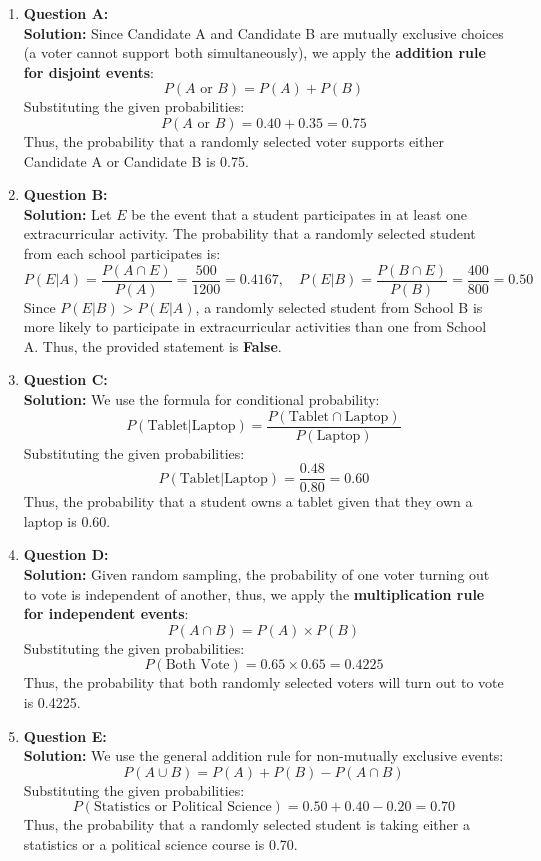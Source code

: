 \documentclass{article}
\begin{document}
\begin{enumerate}

    \item \textbf{Question A:} \\
    \textbf{Solution:} Since Candidate A and Candidate B are mutually exclusive choices (a voter cannot support both simultaneously), we apply the \textbf{addition rule for disjoint events}:
    \[
    P(A \text{ or } B) = P(A) + P(B)
    \]
    Substituting the given probabilities:
    \[
    P(A \text{ or } B) = 0.40 + 0.35 = 0.75
    \]
    Thus, the probability that a randomly selected voter supports either Candidate A or Candidate B is 0.75.

    \item \textbf{Question B:} \\
    \textbf{Solution:} Let \( E \) be the event that a student participates in at least one extracurricular activity. The probability that a randomly selected student from each school participates is:
    \[
    P(E | A) = \frac{P(A \cap E)}{P(A)} = \frac{500}{1200} = 0.4167, \quad 
    P(E | B) =  \frac{P(B \cap E)}{P(B)} = \frac{400}{800} = 0.50
    \]
    Since \( P(E | B) > P(E | A) \), a randomly selected student from School B is more likely to participate in extracurricular activities than one from School A. Thus, the provided statement is \textbf{False}.

    \item \textbf{Question C:} \\
    \textbf{Solution:} We use the formula for conditional probability:
    \[
    P(\text{Tablet} | \text{Laptop}) = \frac{P(\text{Tablet} \cap \text{Laptop})}{P(\text{Laptop})}
    \]
    Substituting the given probabilities:
    \[
    P(\text{Tablet} | \text{Laptop}) = \frac{0.48}{0.80} = 0.60
    \]
    Thus, the probability that a student owns a tablet given that they own a laptop is 0.60.

    \item \textbf{Question D:} \\
    \textbf{Solution:} Given random sampling, the probability of one voter turning out to vote is independent of another, thus, we apply the \textbf{multiplication rule for independent events}:
    \[
    P(A \cap B) = P(A) \times P(B)
    \]
    Substituting the given probabilities:
    \[
    P(\text{Both Vote}) = 0.65 \times 0.65 = 0.4225
    \]
    Thus, the probability that both randomly selected voters will turn out to vote is 0.4225.

    \item \textbf{Question E:} \\
    \textbf{Solution:} We use the general addition rule for non-mutually exclusive events:
    \[
    P(A \cup B) = P(A) + P(B) - P(A \cap B)
    \]
    Substituting the given probabilities:
    \[
    P(\text{Statistics or Political Science}) = 0.50 + 0.40 - 0.20 = 0.70
    \]
    Thus, the probability that a randomly selected student is taking either a statistics or a political science course is 0.70.


\end{enumerate}
\end{document}
